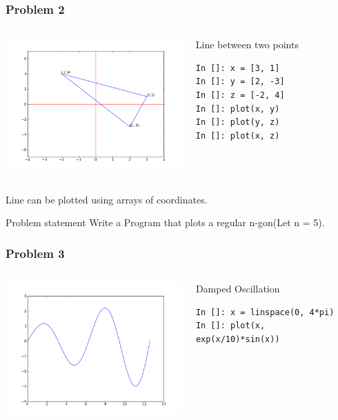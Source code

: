 \documentclass[14pt,compress]{beamer}
\begin{document}
\begin{frame}[fragile]
  \frametitle{Problem 2}
  \begin{columns}
    \hspace*{-0.5in}
    \includegraphics[height=2in, interpolate=true]{data/triangle}
    \begin{block}{Line between two points}
    \tiny
    \begin{lstlisting}
In []: x = [3, 1]
In []: y = [2, -3]
In []: z = [-2, 4]
In []: plot(x, y)
In []: plot(y, z)
In []: plot(x, z)
    \end{lstlisting}
    \end{block}
  \end{columns}
  Line can be plotted using arrays of coordinates.
  \pause
  \begin{block}{Problem statement}
    Write a Program that plots a regular n-gon(Let n = 5).
  \end{block}  
\end{frame}


\begin{frame}[fragile]
  \frametitle{Problem 3}
  \begin{columns}
    \hspace*{-0.5in}
    \includegraphics[height=2in, interpolate=true]{data/damp}
    \begin{block}{Damped Oscillation}
    \tiny
    \begin{lstlisting}
In []: x = linspace(0, 4*pi)
In []: plot(x, exp(x/10)*sin(x))
    \end{lstlisting}
    \end{block}
  \end{columns}
\end{frame}
\end{document}
